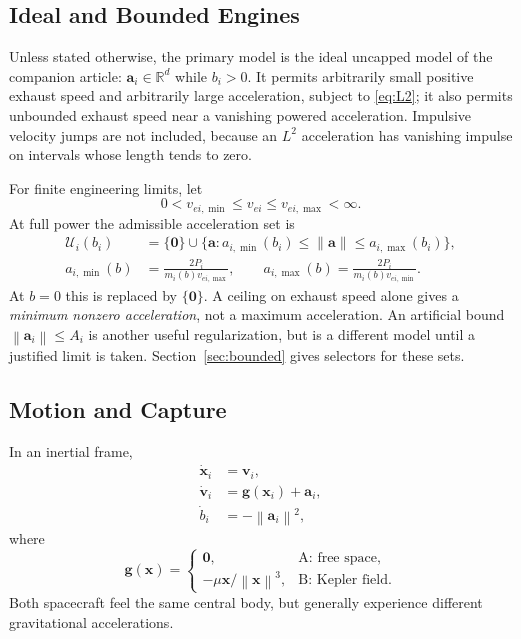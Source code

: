 \documentclass[journal,a4paper]{IEEEtran}
\newcommand{\R}{\mathbb R}
\newcommand{\U}{\mathcal U}
\newcommand{\norm}[1]{\left\|#1\right\|}
\begin{document}
\subsection{Ideal and Bounded Engines}
Unless stated otherwise, the primary model is the ideal uncapped model of the companion article: $\mathbf a_i\in\R^d$ while $b_i>0$. It permits arbitrarily small positive exhaust speed and arbitrarily large acceleration, subject to \eqref{eq:L2}; it also permits unbounded exhaust speed near a vanishing powered acceleration. Impulsive velocity jumps are not included, because an $L^2$ acceleration has vanishing impulse on intervals whose length tends to zero.

For finite engineering limits, let
\begin{equation}
 0<v_{ei,\min}\le v_{ei}\le v_{ei,\max}<\infty.
\end{equation}
At full power the admissible acceleration set is
\begin{align}
 \U_i(b_i)&=\{\mathbf0\}\cup
 \{\mathbf a:a_{i,\min}(b_i)\le\norm{\mathbf a}
                         \le a_{i,\max}(b_i)\},\label{eq:annulus}\\
 a_{i,\min}(b)&=\frac{2P_i}{m_i(b)v_{ei,\max}},\qquad
 a_{i,\max}(b)=\frac{2P_i}{m_i(b)v_{ei,\min}}.\nonumber
\end{align}
At $b=0$ this is replaced by $\{\mathbf0\}$. A ceiling on exhaust speed alone gives a \emph{minimum nonzero acceleration}, not a maximum acceleration. An artificial bound $\norm{\mathbf a_i}\le A_i$ is another useful regularization, but is a different model until a justified limit is taken. Section~\ref{sec:bounded} gives selectors for these sets.

\subsection{Motion and Capture}
In an inertial frame,
\begin{subequations}\label{eq:fullstate}
\begin{align}
 \dot{\mathbf x}_i&=\mathbf v_i,\\
 \dot{\mathbf v}_i&=\mathbf g(\mathbf x_i)+\mathbf a_i,\\
 \dot b_i&=-\norm{\mathbf a_i}^2,
\end{align}
\end{subequations}
where
\begin{equation}
 \mathbf g(\mathbf x)=
 \begin{cases}
 \mathbf0,&\text{A: free space},\\
 -\mu\mathbf x/\norm{\mathbf x}^3,&\text{B: Kepler field}.
 \end{cases}
 \label{eq:gravity}
\end{equation}
Both spacecraft feel the same central body, but generally experience different gravitational accelerations.
\end{document}
